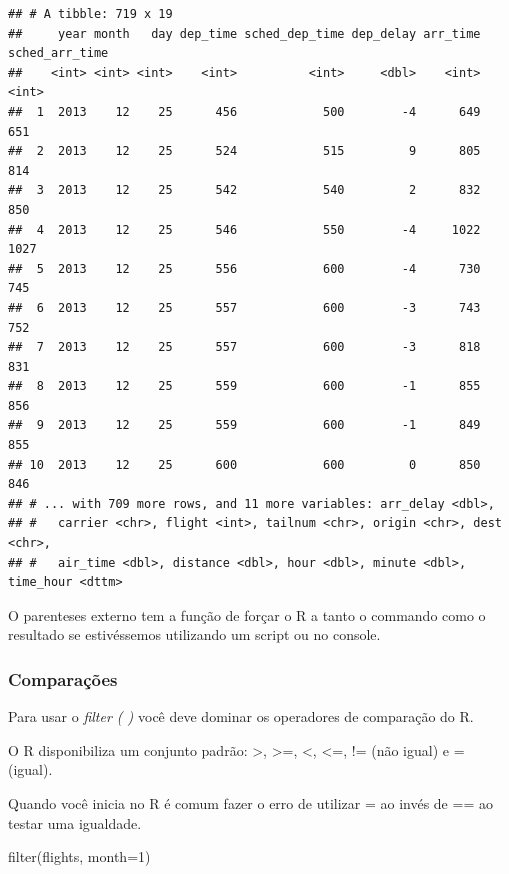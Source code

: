 \documentclass[
]{article}
\newenvironment{Shaded}{\begin{snugshade}}{\end{snugshade}}
\newcommand{\AttributeTok}[1]{\textcolor[rgb]{0.77,0.63,0.00}{#1}}
\newcommand{\DecValTok}[1]{\textcolor[rgb]{0.00,0.00,0.81}{#1}}
\newcommand{\FunctionTok}[1]{\textcolor[rgb]{0.00,0.00,0.00}{#1}}
\newcommand{\NormalTok}[1]{#1}
\begin{document}
\begin{verbatim}
## # A tibble: 719 x 19
##     year month   day dep_time sched_dep_time dep_delay arr_time sched_arr_time
##    <int> <int> <int>    <int>          <int>     <dbl>    <int>          <int>
##  1  2013    12    25      456            500        -4      649            651
##  2  2013    12    25      524            515         9      805            814
##  3  2013    12    25      542            540         2      832            850
##  4  2013    12    25      546            550        -4     1022           1027
##  5  2013    12    25      556            600        -4      730            745
##  6  2013    12    25      557            600        -3      743            752
##  7  2013    12    25      557            600        -3      818            831
##  8  2013    12    25      559            600        -1      855            856
##  9  2013    12    25      559            600        -1      849            855
## 10  2013    12    25      600            600         0      850            846
## # ... with 709 more rows, and 11 more variables: arr_delay <dbl>,
## #   carrier <chr>, flight <int>, tailnum <chr>, origin <chr>, dest <chr>,
## #   air_time <dbl>, distance <dbl>, hour <dbl>, minute <dbl>, time_hour <dttm>
\end{verbatim}

O parenteses externo tem a função de forçar o R a tanto o commando como
o resultado se estivéssemos utilizando um script ou no console.

\hypertarget{comparauxe7uxf5es}{%
\subsubsection{Comparações}\label{comparauxe7uxf5es}}

Para usar o \emph{filter ( )} você deve dominar os operadores de
comparação do R.

O R disponibiliza um conjunto padrão: \textgreater, \textgreater=,
\textless, \textless=, != (não igual) e = (igual).

Quando você inicia no R é comum fazer o erro de utilizar = ao invés de
== ao testar uma igualdade.

\begin{Shaded}
\begin{Highlighting}[]
\FunctionTok{filter}\NormalTok{(flights, }\AttributeTok{month=}\DecValTok{1}\NormalTok{)}
\end{Highlighting}
\end{Shaded}
\end{document}
